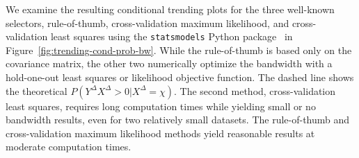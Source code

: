 \documentclass[pdflatex]{sn-jnl}
\theoremstyle{plain}%
\theoremstyle{definition}
\newcommand{\diffxrv}{X^{\Delta}}
\newcommand{\diffyrv}{Y^{\Delta}}
\newcommand{\xcond}{\chi}
\begin{document}
We examine the resulting conditional trending plots for the three well-known selectors, rule-of-thumb, cross-validation maximum likelihood, and cross-validation least squares using the \verb|statsmodels| Python package~\citep{Seabold2010} in Figure~\ref{fig:trending-cond-prob-bw}.
While the rule-of-thumb is based only on the covariance matrix, the other two numerically optimize the bandwidth with a hold-one-out least squares or likelihood objective function.
The dashed line shows the theoretical $P(\diffyrv \diffxrv > 0 | \diffxrv = \xcond)$.
The second method, cross-validation least squares, requires long computation times while yielding small or no bandwidth results, even for two relatively small datasets.
The rule-of-thumb and cross-validation maximum likelihood methods yield reasonable results at moderate computation times.
\end{document}
